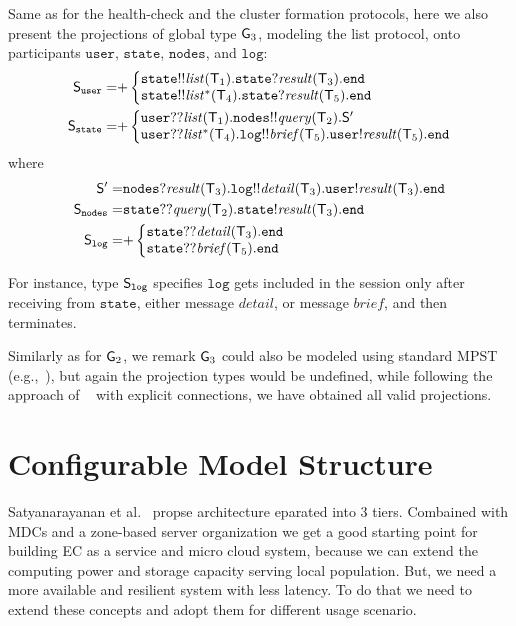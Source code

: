 Same as for the health-check and the cluster formation protocols, here we also present the projections of global type ${\sf G}_3$, modeling the list protocol, onto participants $\mathtt{user}$, $\mathtt{state}$, $\mathtt{nodes}$, and $\mathtt{log}$:
\begin{align*}
\ST_\mathtt{user} =& 
{+}
\left\{
\begin{array}{@{}l@{}}  
\mathtt{state}{!!}\mathit{list}(\T_1).\mathtt{state}{?}\mathit{result}(\T_3).\tend \\
\mathtt{state}{!!}\mathit{list^*}(\T_4).\mathtt{state}{?}\mathit{result}(\T_5).\tend 
\end{array} \right. \\
%
%
\ST_\mathtt{state} =&
{+}
\left\{
\begin{array}{@{}l@{}}  
\mathtt{user}{??}\mathit{list}(\T_1).\mathtt{nodes}{!!}\mathit{query}(\T_2).\ST'\\
\mathtt{user}{??}\mathit{list^*}(\T_4).\mathtt{log}{!!}\mathit{brief}(\T_5).\mathtt{user}{!}\mathit{result}(\T_5).\tend
\end{array} \right. 
\end{align*}
where
\begin{align*}
%
\ST'  =& 
\mathtt{nodes}{?}\mathit{result}(\T_3).\mathtt{log}{!!}\mathit{detail}(\T_3).\mathtt{user}{!}\mathit{result}(\T_3).\tend\\
%
%
\ST_\mathtt{nodes} = &
\mathtt{state}{??}\mathit{query}(\T_2).\mathtt{state}{!}\mathit{result}(\T_3).\tend \\
%
%
\ST_\mathtt{log} = & 
{+}
\left\{
\begin{array}{@{}l@{}}  
\mathtt{state}{??}\mathit{detail}(\T_3).\tend \\
\mathtt{state}{??}\mathit{brief}(\T_5).\tend \\
\end{array} \right.
\end{align*}

For instance, type ${\mathsf S}_\mathtt{log}$ specifies $\mathtt{log}$ gets included in the session only after receiving from $\mathtt{state}$, either message $\mathit{detail}$, or message $\mathit{brief}$, and then terminates. 

Similarly as for ${\sf G}_2$, we remark ${\sf G}_3$ could also be modeled using standard MPST (e.g.,~\cite{HondaYC08}), but again the projection types would be undefined, while following the approach of ~\cite{HuY17} with explicit connections, we have obtained all valid projections.
%
%
\section{Configurable Model Structure}\label{sec:configurable_model_structure}
%
Satyanarayanan et al.~\cite{SatyanarayananK19} propse architecture eparated into 3 tiers. Combained with MDCs and a zone-based server organization we get a good starting point for building EC as a service and micro cloud system, because we can extend the computing power and storage capacity serving local population. But, we need a more available and resilient system with less latency. To do that we need to extend these concepts and adopt them for different usage scenario.

